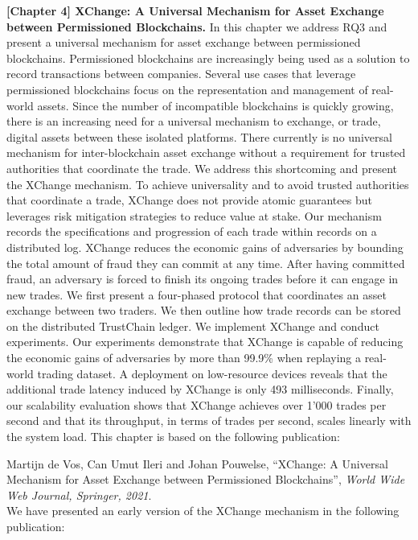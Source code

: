 \textbf{[Chapter 4] XChange: A Universal Mechanism for Asset Exchange between Permissioned Blockchains.}
In this chapter we address RQ3 and present a universal mechanism for asset exchange between permissioned blockchains.
Permissioned blockchains are increasingly being used as a solution to record transactions between companies.
Several use cases that leverage permissioned blockchains focus on the representation and management of real-world assets.
Since the number of incompatible blockchains is quickly growing, there is an increasing need for a universal mechanism to exchange, or trade, digital assets between these isolated platforms.
There currently is no universal mechanism for inter-blockchain asset exchange without a requirement for trusted authorities that coordinate the trade.
We address this shortcoming and present the XChange mechanism.
To achieve universality and to avoid trusted authorities that coordinate a trade, XChange does not provide atomic guarantees but leverages risk mitigation strategies to reduce value at stake.
Our mechanism records the specifications and progression of each trade within records on a distributed log.
XChange reduces the economic gains of adversaries by bounding the total amount of fraud they can commit at any time.
After having committed fraud, an adversary is forced to finish its ongoing trades before it can engage in new trades.
We first present a four-phased protocol that coordinates an asset exchange between two traders.
We then outline how trade records can be stored on the distributed TrustChain ledger.
We implement XChange and conduct experiments.
Our experiments demonstrate that XChange is capable of reducing the economic gains of adversaries by more than 99.9\% when replaying a real-world trading dataset.
A deployment on low-resource devices reveals that the additional trade latency induced by XChange is only 493 milliseconds.
Finally, our scalability evaluation shows that XChange achieves over 1’000 trades per second and that its throughput, in terms of trades per second, scales linearly with the system load.
This chapter is based on the following publication:

Martijn de Vos, Can Umut Ileri and Johan Pouwelse, \enquote{XChange: A Universal Mechanism for Asset Exchange between Permissioned Blockchains}, \emph{World Wide Web Journal, Springer, 2021}.\\

\noindent We have presented an early version of the XChange mechanism in the following publication:\\

